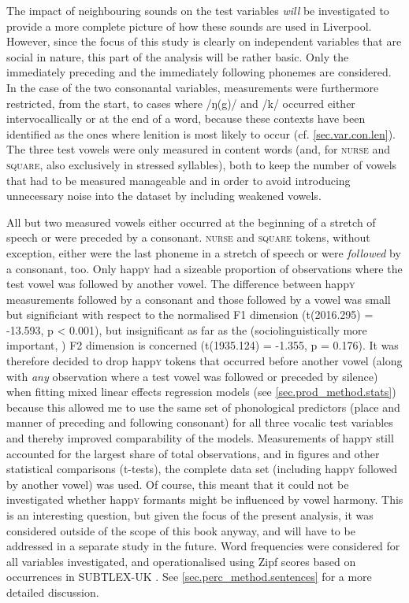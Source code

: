 The impact of neighbouring sounds on the test variables \emph{will} be investigated to provide a more complete picture of how these sounds are used in Liverpool.
However, since the focus of this study is clearly on independent variables that are social in nature, this part of the analysis will be rather basic.
Only the immediately preceding and the immediately following phonemes are considered.
In the case of the two consonantal variables, measurements were furthermore restricted, from the start, to cases where /ŋ(g)/ and /k/ occurred either intervocallically or at the end of a word, because these contexts have been identified as the ones where lenition is most likely to occur (cf. \ref{sec.var.con.len}).
The three test vowels were only measured in content words (and, for \textsc{nurse} and \textsc{square}, also exclusively in stressed syllables), both to keep the number of vowels that had to be measured manageable and in order to avoid introducing unnecessary noise into the dataset by including weakened vowels.

All but two measured vowels either occurred at the beginning of a stretch of speech or were preceded by a consonant.
\textsc{nurse} and \textsc{square} tokens, without exception, either were the last phoneme in a stretch of speech or were \emph{followed} by a consonant, too.
Only happ\textsc{y} had a sizeable proportion of observations where the test vowel was followed by another vowel.
The difference between happ\textsc{y} measurements followed by a consonant and those followed by a vowel was small but significiant with respect to the normalised F1 dimension (t(2016.295) = -13.593, p < 0.001), but insignificant as far as the (sociolinguistically more important, \citealt[cf.][502]{labov2006a}) F2 dimension is concerned (t(1935.124) = -1.355, p = 0.176).
It was therefore decided to drop happ\textsc{y} tokens that occurred before another vowel (along with \emph{any} observation where a test vowel was followed or preceded by silence) when fitting mixed linear effects regression models (see \ref{sec.prod_method.stats}) because this allowed me to use the same set of phonological predictors (place and manner of preceding and following consonant) for all three vocalic test variables and thereby improved comparability of the models.
Measurements of happ\textsc{y} still accounted for the largest share of total observations, and in figures and other statistical comparisons (t-tests), the complete data set (including happ\textsc{y} followed by another vowel) was used.
Of course, this meant that it could not be investigated whether happ\textsc{y} formants might be influenced by vowel harmony.
This is an interesting question, but given the focus of the present analysis, it was considered outside of the scope of this book anyway, and will have to be addressed in a separate study in the future.
Word frequencies were considered for all variables investigated, and operationalised using Zipf scores based on occurrences in SUBTLEX-UK \parencite{heuvenetal2014}.
See \ref{sec.perc_method.sentences} for a more detailed discussion.

